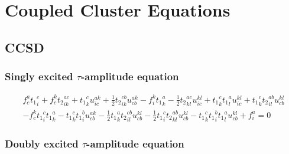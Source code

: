 \chapter{Coupled Cluster Equations}

\section{CCSD}

\subsection{Singly excited $\tau$-amplitude equation}

\begin{gather*}
f^{a}_{c} {t_1}^{c}_{i} 
+ f^{k}_{c} {t_2}^{ac}_{ik} 
+ {t_1}^{c}_{k} u^{ak}_{ic}
+ \frac{1}{2}{t_2}^{cb}_{ik} u^{ak}_{cb} 
- f^{k}_{i} {t_1}^{a}_{k}
- \frac{1}{2}{t_2}^{ac}_{kl} u^{kl}_{ic}
+ {t_1}^{c}_{k} {t_1}^{a}_{l} u^{kl}_{ic} 
 + {t_1}^{c}_{k} {t_2}^{ab}_{il} u^{kl}_{cb} \\
- f^{k}_{c} {t_1}^{c}_{i} {t_1}^{a}_{k}
- {t_1}^{c}_{k} {t_1}^{b}_{i} u^{ak}_{cb}
- \frac{1}{2}{t_1}^{a}_{k} {t_2}^{cb}_{il} u^{kl}_{cb}
- \frac{1}{2}{t_1}^{c}_{i} {t_2}^{ab}_{kl} u^{kl}_{cb}
- {t_1}^{c}_{k} {t_1}^{b}_{i} {t_1}^{a}_{l} u^{kl}_{cb}
+ f^{a}_{i}
= 0
\end{gather*}

\subsection{Doubly excited $\tau$-amplitude equation}

